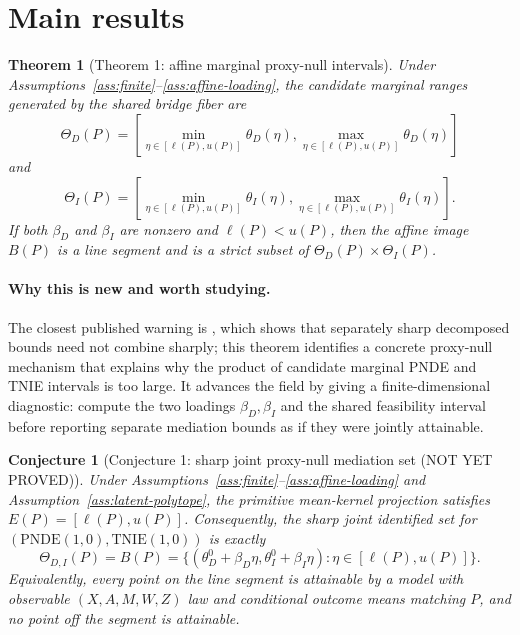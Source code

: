 \documentclass[11pt]{article}
\theoremstyle{definition}
\theoremstyle{plain}
\newtheorem{theorem}{Theorem}
\newtheorem{conjecture}{Conjecture}
\theoremstyle{remark}
\begin{document}
\section{Main results}
\begin{theorem}[Theorem 1: affine marginal proxy-null intervals]\label{thm:affine-marginals}
Under Assumptions~\ref{ass:finite}--\ref{ass:affine-loading}, the candidate
marginal ranges generated by the shared bridge fiber are
\[
  \Theta_D(P)=
  [\min_{\eta\in[\ell(P),u(P)]}\theta_D(\eta),
   \max_{\eta\in[\ell(P),u(P)]}\theta_D(\eta)]
\]
and
\[
  \Theta_I(P)=
  [\min_{\eta\in[\ell(P),u(P)]}\theta_I(\eta),
   \max_{\eta\in[\ell(P),u(P)]}\theta_I(\eta)].
\]
If both \(\beta_D\) and \(\beta_I\) are nonzero and \(\ell(P)<u(P)\), then
the affine image \(B(P)\) is a line segment and is a strict subset of
\(\Theta_D(P)\times\Theta_I(P)\).
\end{theorem}

\paragraph{Why this is new and worth studying.}
The closest published warning is \citet{GabrielSachsSjolander2023}, which
shows that separately sharp decomposed bounds need not combine sharply; this
theorem identifies a concrete proxy-null mechanism that explains why the
product of candidate marginal PNDE and TNIE intervals is too large.  It advances the
field by giving a finite-dimensional diagnostic: compute the two loadings
\(\beta_D,\beta_I\) and the shared feasibility interval before reporting
separate mediation bounds as if they were jointly attainable.

\begin{conjecture}[Conjecture 1: sharp joint proxy-null mediation set (NOT YET PROVED)]\label{conj:sharp-joint}
Under Assumptions~\ref{ass:finite}--\ref{ass:affine-loading} and
Assumption~\ref{ass:latent-polytope}, the primitive mean-kernel projection
satisfies \(E(P)=[\ell(P),u(P)]\).  Consequently, the sharp joint identified
set for \((\mathrm{PNDE}(1,0),\mathrm{TNIE}(1,0))\) is exactly
\[
  \Theta_{D,I}(P)=B(P)
  =\{(\theta_D^0+\beta_D\eta,\theta_I^0+\beta_I\eta):
       \eta\in[\ell(P),u(P)]\}.
\]
Equivalently, every point on the line segment is attainable by a model with
observable \((X,A,M,W,Z)\) law and conditional outcome means matching \(P\),
and no point off the segment is attainable.
\end{conjecture}
\end{document}
